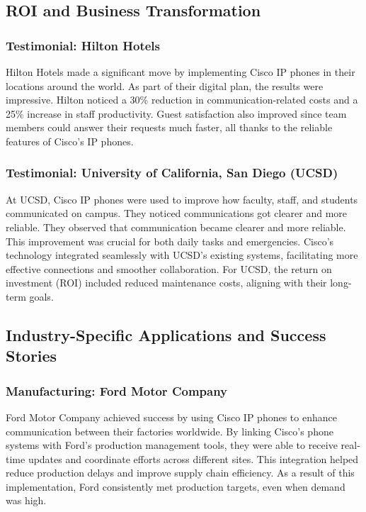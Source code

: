 \documentclass[11pt,a4paper]{article}
\begin{document}
\subsection*{ROI and Business Transformation}

\subsubsection*{Testimonial: Hilton Hotels}

Hilton Hotels made a significant move by implementing Cisco IP phones in their locations around the world. As part of their digital plan, the results were impressive. Hilton noticed a 30\% reduction in communication-related costs and a 25\% increase in staff productivity. Guest satisfaction also improved since team members could answer their requests much faster, all thanks to the reliable features of Cisco’s IP phones.


\subsubsection*{Testimonial: University of California, San Diego (UCSD)}

At UCSD, Cisco IP phones were used to improve how faculty, staff, and students communicated on campus. They noticed communications got clearer and more reliable. They observed that communication became clearer and more reliable. This improvement was crucial for both daily tasks and emergencies. Cisco's technology integrated seamlessly with UCSD’s existing systems, facilitating more effective connections and smoother collaboration. For UCSD, the return on investment (ROI) included reduced maintenance costs, aligning with their long-term goals.

\subsection*{Industry-Specific Applications and Success Stories}

\subsubsection*{Manufacturing: Ford Motor Company}
Ford Motor Company achieved success by using Cisco IP phones to enhance communication between their factories worldwide. By linking Cisco’s phone systems with Ford's production management tools, they were able to receive real-time updates and coordinate efforts across different sites. This integration helped reduce production delays and improve supply chain efficiency. As a result of this implementation, Ford consistently met production targets, even when demand was high.
\end{document}
